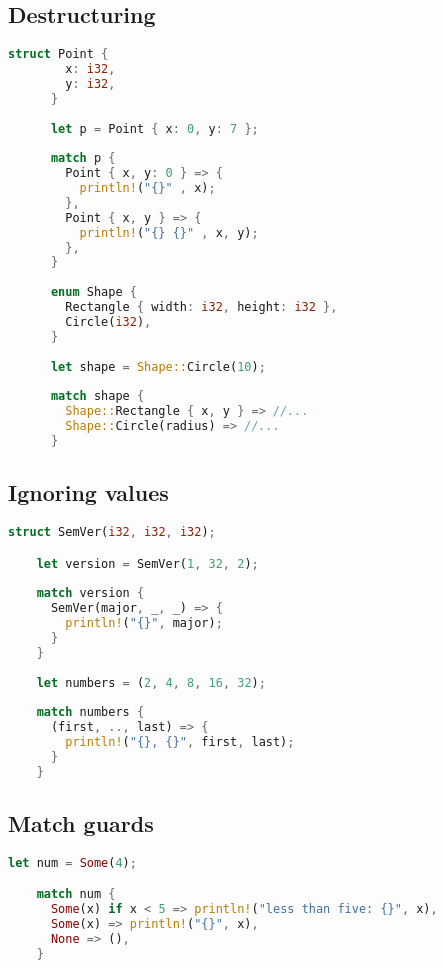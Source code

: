\documentclass{article}
\begin{document}
\pagebreak

\subsection{Destructuring}

\begin{lstlisting}[language=Rust, style=boxed, numbers=none]
    struct Point {
        x: i32,
        y: i32,
      }
      
      let p = Point { x: 0, y: 7 };
      
      match p {
        Point { x, y: 0 } => {
          println!("{}" , x);
        },
        Point { x, y } => {
          println!("{} {}" , x, y);
        },
      }
      
      enum Shape {
        Rectangle { width: i32, height: i32 },
        Circle(i32),
      }
      
      let shape = Shape::Circle(10);
      
      match shape {
        Shape::Rectangle { x, y } => //...
        Shape::Circle(radius) => //...
      }
\end{lstlisting}

\subsection{Ignoring values}

\begin{lstlisting}[language=Rust, style=boxed, numbers=none]
    struct SemVer(i32, i32, i32);

    let version = SemVer(1, 32, 2);
    
    match version {
      SemVer(major, _, _) => {
        println!("{}", major);
      }
    }
    
    let numbers = (2, 4, 8, 16, 32);
    
    match numbers {
      (first, .., last) => {
        println!("{}, {}", first, last);
      }
    }
\end{lstlisting}

\pagebreak

\subsection{Match guards}

\begin{lstlisting}[language=Rust, style=boxed, numbers=none]
    let num = Some(4);

    match num {
      Some(x) if x < 5 => println!("less than five: {}", x),
      Some(x) => println!("{}", x),
      None => (),
    }
\end{lstlisting}
\end{document}
